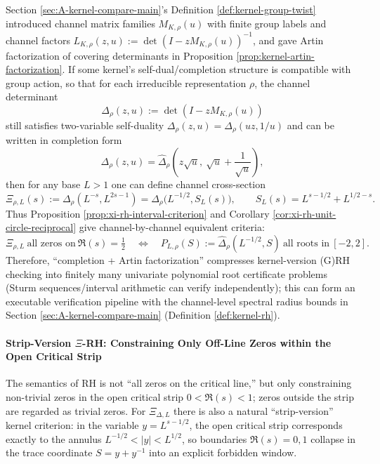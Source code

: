 \begin{remark}\label{rem:xi-artin-channel-pipeline}
Section \ref{sec:A-kernel-compare-main}'s Definition \ref{def:kernel-group-twist} introduced channel matrix families \(M_{K,\rho}(u)\) with finite group labels and channel factors
\(
L_{K,\rho}(z,u):=\det(I-zM_{K,\rho}(u))^{-1}
\), and gave Artin factorization of covering determinants in Proposition \ref{prop:kernel-artin-factorization}.
If some kernel's self-dual/completion structure is compatible with group action, so that for each irreducible representation \(\rho\), the channel determinant
\[
\Delta_\rho(z,u):=\det(I-zM_{K,\rho}(u))
\]
still satisfies two-variable self-duality \(\Delta_\rho(z,u)=\Delta_\rho(uz,1/u)\) and can be written in completion form
\[
\Delta_\rho(z,u)=\widehat\Delta_\rho\!\left(z\sqrt{u},\ \sqrt{u}+\frac{1}{\sqrt{u}}\right),
\]
then for any base \(L>1\) one can define channel cross-section
\[
\Xi_{\rho,L}(s):=\Delta_\rho(L^{-s},L^{2s-1})
=\widehat\Delta_\rho\!\bigl(L^{-1/2},S_L(s)\bigr),
\qquad S_L(s)=L^{s-1/2}+L^{1/2-s}.
\]
Thus Proposition \ref{prop:xi-rh-interval-criterion} and Corollary \ref{cor:xi-rh-unit-circle-reciprocal} give channel-by-channel equivalent criteria:
\[
\Xi_{\rho,L}\ \text{all zeros on}\ \Re(s)=\tfrac12
\quad\Longleftrightarrow\quad
P_{L,\rho}(S):=\widehat\Delta_\rho(L^{-1/2},S)\ \text{all roots in}\ [-2,2].
\]
Therefore, ``completion + Artin factorization'' compresses kernel-version (G)RH checking into finitely many univariate polynomial root certificate problems (Sturm sequences/interval arithmetic can verify independently); this can form an executable verification pipeline with the channel-level spectral radius bounds in Section \ref{sec:A-kernel-compare-main} (Definition \ref{def:kernel-rh}).
\end{remark}

\paragraph{Strip-Version \texorpdfstring{$\Xi$}{Xi}-RH: Constraining Only Off-Line Zeros within the Open Critical Strip}
The semantics of RH is not ``all zeros on the critical line,'' but only constraining non-trivial zeros in the open critical strip \(0<\Re(s)<1\);
zeros outside the strip are regarded as trivial zeros.
For \(\Xi_{\Delta,L}\) there is also a natural ``strip-version'' kernel criterion: in the variable \(y=L^{s-1/2}\),
the open critical strip corresponds exactly to the annulus \(L^{-1/2}<|y|<L^{1/2}\), so boundaries \(\Re(s)=0,1\) collapse in the trace coordinate \(S=y+y^{-1}\) into an explicit forbidden window.

